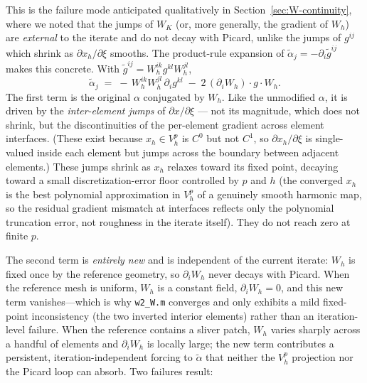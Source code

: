 \documentclass[11pt]{article}
\begin{document}
This is the failure mode anticipated qualitatively in
Section~\ref{sec:W-continuity}, where we noted that the jumps of
$W_K$ (or, more generally, the gradient of $W_h$) are
\emph{external} to the iterate and do not decay with Picard,
unlike the jumps of $g^{ij}$ which shrink as $\partial x_h /
\partial \xi$ smooths. The product-rule expansion of
$\tilde\alpha_j = -\partial_i \tilde g^{ij}$ makes this concrete.
With $\tilde g^{ij} = W_h^{ik} g^{kl} W_h^{jl}$,
\begin{equation}
  \tilde\alpha_j
  \;=\; -\,W_h^{ik} W_h^{jl}\,\partial_i g^{kl}
       \;-\; 2\,(\partial_i W_h) \cdot g \cdot W_h.
  \label{eq:tildealpha-split}
\end{equation}
The first term is the original $\alpha$ conjugated by $W_h$.
Like the unmodified $\alpha$, it is driven by the
\emph{inter-element jumps} of $\partial x / \partial \xi$ ---
not its magnitude, which does not shrink, but the discontinuities
of the per-element gradient across element interfaces. (These
exist because $x_h \in V_h^p$ is $C^0$ but not $C^1$, so
$\partial x_h / \partial \xi$ is single-valued inside each
element but jumps across the boundary between adjacent elements.)
These jumps shrink as $x_h$ relaxes toward its fixed
point, decaying toward a small discretization-error floor
controlled by $p$ and $h$ (the converged $x_h$ is the best
polynomial approximation in $V_h^p$ of a genuinely smooth
harmonic map, so the residual gradient mismatch at interfaces
reflects only the polynomial truncation error, not roughness in
the iterate itself). They do not reach zero at finite $p$.

The second term is \emph{entirely new} and is
independent of the current iterate: $W_h$ is fixed once by the
reference geometry, so $\partial_i W_h$ never decays with
Picard. When the reference mesh is uniform, $W_h$ is a constant
field, $\partial_i W_h = 0$, and this new term vanishes---which
is why \texttt{w2\_W.m} converges and only exhibits a mild
fixed-point inconsistency (the two inverted interior elements)
rather than an iteration-level failure. When the reference
contains a sliver patch, $W_h$ varies sharply across a handful
of elements and $\partial_i W_h$ is locally large; the new term
contributes a persistent, iteration-independent forcing to
$\tilde\alpha$ that neither the $V_h^p$ projection nor the
Picard loop can absorb. Two failures result:
\end{document}

